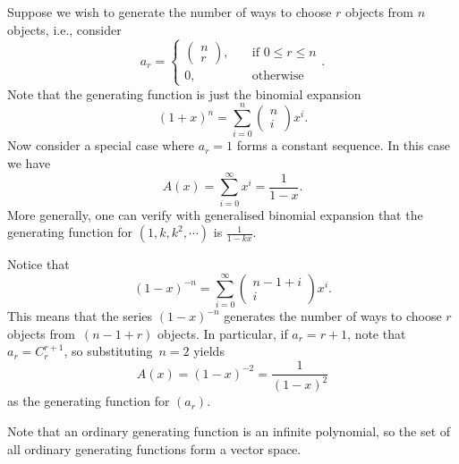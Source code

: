 \documentclass[math]{amznotes}
\theoremstyle{remark}
\newcommand{\0}{\mathbf{0}}
\newcommand{\1}{\mathbf{1}}
\begin{document}
Suppose we wish to generate the number of ways to choose $r$ objects from $n$ objects, i.e., consider
\begin{equation*}
    a_r = \begin{cases}
        \begin{pmatrix}
            n \\
            r
        \end{pmatrix}, & \quad\textrm{if } 0 \leq r \leq n \\
        0, & \quad\textrm{otherwise}
    \end{cases}.
\end{equation*}
Note that the generating function is just the binomial expansion
\begin{equation*}
    (1 + x)^n = \sum_{i = 0}^{n}\begin{pmatrix}
        n \\
        i
    \end{pmatrix}x^i.
\end{equation*}
Now consider a special case where $a_r = 1$ forms a constant sequence. In this case we have
\begin{equation*}
    A(x) = \sum_{i = 0}^{\infty}x^i = \frac{1}{1 - x}.
\end{equation*}
More generally, one can verify with generalised binomial expansion that the generating function for $\left(1, k, k^2, \cdots\right)$ is $\frac{1}{1 - kx}$.

Notice that
\begin{equation*}
    (1 - x)^{-n} = \sum_{i = 0}^{\infty}\begin{pmatrix}
        n - 1 + i \\
        i
    \end{pmatrix}x^i.
\end{equation*}
This means that the series $(1 - x)^{-n}$ generates the number of ways to choose $r$ objects from~$(n - 1 + r)$ objects. In particular, if $a_r = r + 1$, note that $a_r = C^{r + 1}_r$, so substituting~$n = 2$ yields
\begin{equation*}
    A(x) = (1 - x)^{-2} = \frac{1}{(1 - x)^2}
\end{equation*}
as the generating function for $(a_r)$.

Note that an ordinary generating function is an infinite polynomial, so the set of all ordinary generating functions form a vector space. 
\end{document}
